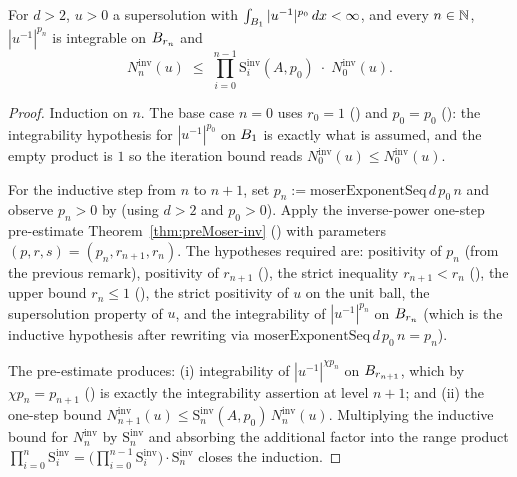 \begin{theorem}
\label{thm:iter-inv}
\leanok
{}
For $d>2$, $u>0$ a supersolution with $\int_{B_{1}} |u^{-1}|^{p_0}\,dx < \infty$,
and every $n \in \mathbb{N}$, $|u^{-1}|^{p_n}$ is integrable on $B_{r_n}$ and
\begin{equation*}
  N_n^{\mathrm{inv}}(u)
  \;\leq\;
  \prod_{i=0}^{n-1}\mathrm{S}_i^{\mathrm{inv}}(A,p_0)\;\cdot\; N_0^{\mathrm{inv}}(u).
\end{equation*}
\end{theorem}

\begin{proof}
\leanok
{}

Induction on $n$. The base case $n = 0$ uses $r_0 = 1$
() and $p_0 = p_0$
(): the integrability hypothesis for
$|u^{-1}|^{p_0}$ on $B_{1}$ is exactly what is assumed, and the empty product
is $1$ so the iteration bound reads $N_0^{\mathrm{inv}}(u) \le N_0^{\mathrm{inv}}(u)$.

For the inductive step from $n$ to $n+1$, set $p_n := \mathrm{moserExponentSeq}\,d\,p_0\,n$
and observe $p_n > 0$ by  (using $d > 2$ and
$p_0 > 0$). Apply the inverse-power one-step pre-estimate
Theorem~\ref{thm:preMoser-inv}
() with parameters $(p, r, s) =
(p_n, r_{n+1}, r_n)$. The hypotheses required are: positivity of $p_n$ (from
the previous remark), positivity of $r_{n+1}$ (),
the strict inequality $r_{n+1} < r_n$ (), the
upper bound $r_n \le 1$ (), the strict
positivity of $u$ on the unit ball, the supersolution property of $u$, and
the integrability of $|u^{-1}|^{p_n}$ on $B_{r_n}$ (which is the inductive
hypothesis after rewriting via $\mathrm{moserExponentSeq}\,d\,p_0\,n = p_n$).

The pre-estimate produces:
(i) integrability of $|u^{-1}|^{\chi p_n}$ on $B_{r_{n+1}}$, which by
$\chi p_n = p_{n+1}$ () is exactly the
integrability assertion at level $n+1$; and
(ii) the one-step bound
$N_{n+1}^{\mathrm{inv}}(u) \le \mathrm{S}_n^{\mathrm{inv}}(A, p_0)\,
N_n^{\mathrm{inv}}(u)$.
Multiplying the inductive bound for $N_n^{\mathrm{inv}}$ by
$\mathrm{S}_n^{\mathrm{inv}}$ and absorbing the additional factor into the
range product
$\prod_{i=0}^{n} \mathrm{S}_i^{\mathrm{inv}} = \bigl(\prod_{i=0}^{n-1} \mathrm{S}_i^{\mathrm{inv}}\bigr)
\cdot \mathrm{S}_n^{\mathrm{inv}}$ closes the induction.
\end{proof}

